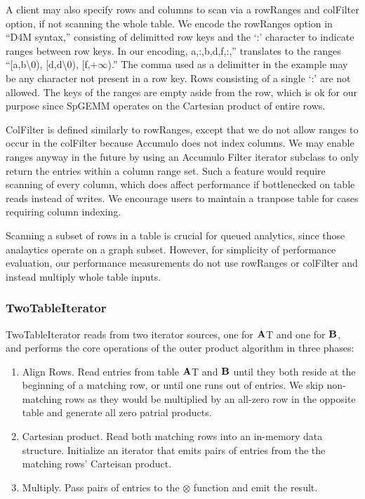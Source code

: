A client may also specify rows and columns to scan via a rowRanges and colFilter option, 
if not scanning the whole table. We encode the rowRanges option in ``D4M syntax,'' consisting of 
delimitted row keys and the `:' character to indicate ranges between row keys.
In our encoding, a,:,b,d,f,:,'' translates to the ranges 
``[a,b\textbackslash{}0), [d,d\textbackslash{}0), [f,$+\infty$).'' The comma used as a delimitter in the example 
may be any character not present in a row key.  Rows consisting of a single `:' are not allowed.
The keys of the ranges are empty aside from the row, which is ok for our purpose since SpGEMM
operates on the Cartesian product of entire rows.

ColFilter is defined similarly to rowRanges, except that we do not allow ranges to occur in the colFilter
because Accumulo does not index columns.  We may enable ranges anyway in the future by using an Accumulo
Filter iterator subclass to only return the entries within a column range set.
Such a feature would require scanning of every column, which does affect performance if bottlenecked on 
table reads instead of writes.
We encourage users to maintain a tranpose table for cases requiring column indexing.

Scanning a subset of rows in a table is crucial for queued analytics, since those analaytics 
operate on a graph subset.  However, for simplicity of performance evaluation, 
our performance measurements do not use rowRanges or colFilter and instead multiply whole table inputs.

\subsubsection{TwoTableIterator}
TwoTableIterator reads from two iterator sources, one for $\mathbf{A}$T and one for $\mathbf{B}$,
and performs the core operations of the outer product algorithm in three phases:
\begin{enumerate}
\item Align Rows.  Read entries from table $\mathbf{A}$T and $\mathbf{B}$ until they both reside at the beginning of a matching row,
or until one runs out of entries. We skip non-matching rows as they would be multiplied by an all-zero row in the
opposite table and generate all zero patrial products.
\item Cartesian product. Read both matching rows into an in-memory data structure. 
Initialize an iterator that emits pairs of entries from the the matching rows' Carteisan product.
\item Multiply. Pass pairs of entries to the $\otimes$ function and emit the result. 
\end{enumerate}

